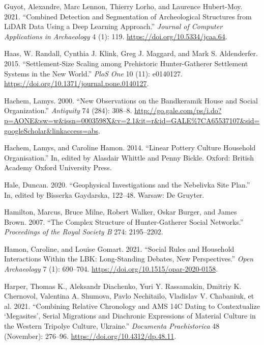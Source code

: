 \documentclass[
  12pt,
  a4paper, twoside]{book}
\newlength{\cslhangindent}
\newlength{\cslentryspacingunit} %
\newenvironment{CSLReferences}[2] %
 {%
  \setlength{\parindent}{0pt}
  \ifodd #1
  \let\oldpar\par
  \def\par{\hangindent=\cslhangindent\oldpar}
  \fi
  \setlength{\parskip}{#2\cslentryspacingunit}
 }%
 {}
\begin{document}
\begin{CSLReferences}{1}{0}
\leavevmode{}%
Guyot, Alexandre, Marc Lennon, Thierry Lorho, and Laurence Hubert-Moy. 2021. {``Combined Detection and Segmentation of Archeological Structures from LiDAR Data Using a Deep Learning Approach.''} \emph{Journal of Computer Applications in Archaeology} 4 (1): 119. \url{https://doi.org/10.5334/jcaa.64}.

\leavevmode{}%
Haas, W. Randall, Cynthia J. Klink, Greg J. Maggard, and Mark S. Aldenderfer. 2015. {``Settlement-Size Scaling among Prehistoric Hunter-Gatherer Settlement Systems in the New World.''} \emph{PloS One} 10 (11): e0140127. \url{https://doi.org/10.1371/journal.pone.0140127}.

\leavevmode{}%
Hachem, Lamys. 2000. {``New Observations on the Bandkeramik House and Social Organization.''} \emph{Antiquity} 74 (284): 308--8. \url{http://go.gale.com/ps/i.do?p=AONE\&sw=w\&issn=0003598X\&v=2.1\&it=r\&id=GALE\%7CA65537107\&sid=googleScholar\&linkaccess=abs}.

\leavevmode{}%
Hachem, Lamys, and Caroline Hamon. 2014. {``Linear Pottery Culture Household Organisation.''} In, edited by Alasdair Whittle and Penny Bickle. Oxford: British Academy Oxford University Press.

\leavevmode{}%
Hale, Duncan. 2020. {``Geophysical Investigations and the Nebelivka Site Plan.''} In, edited by Bisserka Gaydarska, 122--48. Warsaw: De Gruyter.

\leavevmode{}%
Hamilton, Marcus, Bruce Milne, Robert Walker, Oskar Burger, and James Brown. 2007. {``The Complex Structure of Hunter-Gatherer Social Networks.''} \emph{Proceedings of the Royal Society B} 274: 2195--2202.

\leavevmode{}%
Hamon, Caroline, and Louise Gomart. 2021. {``Social Rules and Household Interactions Within the LBK: Long-Standing Debates, New Perspectives.''} \emph{Open Archaeology} 7 (1): 690--704. \url{https://doi.org/10.1515/opar-2020-0158}.

\leavevmode{}%
Harper, Thomas K., Aleksandr Diachenko, Yuri Y. Rassamakin, Dmitriy K. Chernovol, Valentina A. Shumova, Pavlo Nechitailo, Vladislav V. Chabaniuk, et al. 2021. {``Combining Relative Chronology and AMS 14C Dating to Contextualize {`}Megasites{'}, Serial Migrations and Diachronic Expressions of Material Culture in the Western Tripolye Culture, Ukraine.''} \emph{Documenta Praehistorica} 48 (November): 276--96. \url{https://doi.org/10.4312/dp.48.11}.


\end{CSLReferences}
\end{document}
